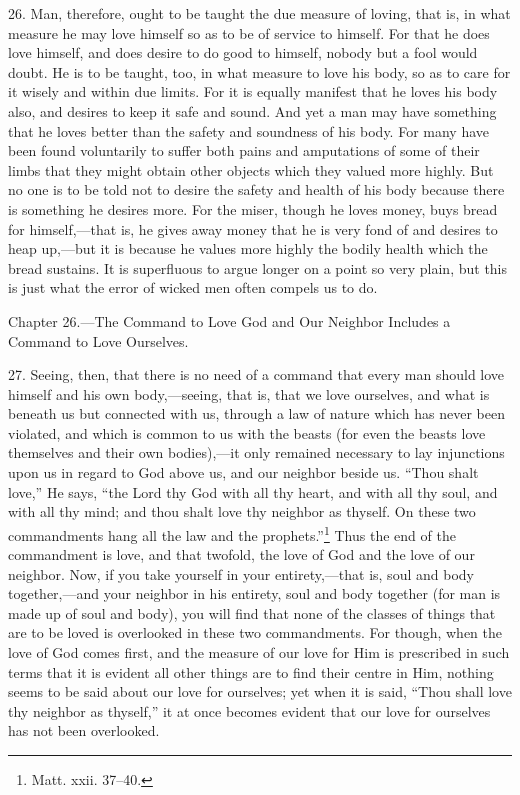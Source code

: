 26. Man, therefore, ought to be taught the due measure of loving, that is, in what measure he may love himself so as to be of service to himself. For that he does love himself, and does desire to do good to himself, nobody but a fool would doubt. He is to be taught, too, in what measure to love his body, so as to care for it wisely and within due limits. For it is equally manifest that he loves his body also, and desires to keep it safe and sound. And yet a man may have something that he loves better than the safety and soundness of his body. For many have been found voluntarily to suffer both pains and amputations of some of their limbs that they might obtain other objects which they valued more highly. But no one is to be told not to desire the safety and health of his body because there is something he desires more. For the miser, though he loves money, buys bread for himself,—that is, he gives away money that he is very fond of and desires to heap up,—but it is because he values more highly the bodily health which the bread sustains. It is superfluous to argue longer on a point so very plain, but this is just what the error of wicked men often compels us to do.


Chapter 26.—The Command to Love God and Our Neighbor Includes a Command to Love Ourselves.

27. Seeing, then, that there is no need of a command that every man should love himself and his own body,—seeing, that is, that we love ourselves, and what is beneath us but connected with us, through a law of nature which has never been violated, and which is common to us with the beasts (for even the beasts love themselves and their own bodies),—it only remained necessary to lay injunctions upon us in regard to God above us, and our neighbor beside us. “Thou shalt love,” He says, “the Lord thy God with all thy heart, and with all thy soul, and with all thy mind; and thou shalt love thy neighbor as thyself. On these two commandments hang all the law and the prophets.”\footnote{Matt. xxii. 37–40.} Thus the end of the commandment is love, and that twofold, the love of God and the love of our neighbor. Now, if you take yourself in your entirety,—that is, soul and body together,—and your neighbor in his entirety, soul and body together (for man is made up of soul and body), you will find that none of the classes of things that are to be loved is overlooked in these two commandments. For though, when the love of God comes first, and the measure of our love for Him is prescribed in such terms that it is evident all other things are to find their centre in Him, nothing seems to be said about our love for ourselves; yet when it is said, “Thou shall love thy neighbor as thyself,” it at once becomes evident that our love for ourselves has not been overlooked.

